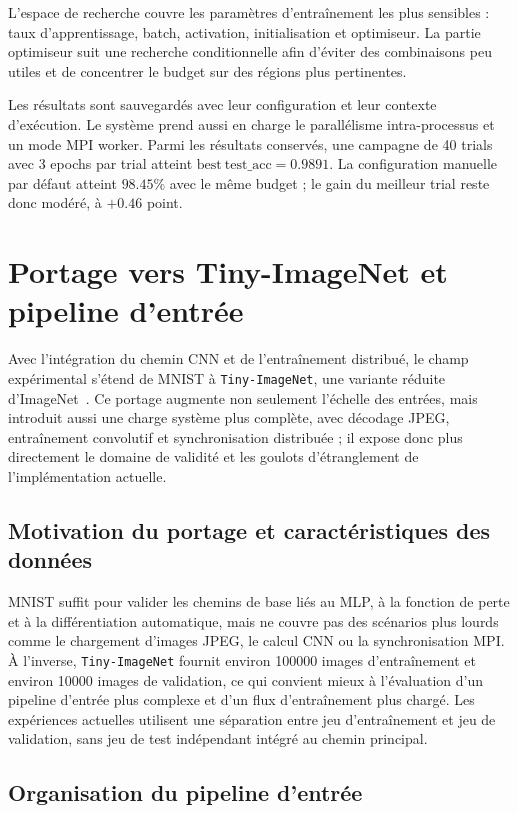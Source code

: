 \documentclass[a4paper,11pt,oneside]{article}
\begin{document}
L'espace de recherche couvre les paramètres d'entraînement les plus sensibles : taux d'apprentissage, batch, activation, initialisation et optimiseur. La partie optimiseur suit une recherche conditionnelle afin d'éviter des combinaisons peu utiles et de concentrer le budget sur des régions plus pertinentes.

Les résultats sont sauvegardés avec leur configuration et leur contexte d'exécution. Le système prend aussi en charge le parallélisme intra-processus et un mode MPI worker. Parmi les résultats conservés, une campagne de 40 trials avec 3 epochs par trial atteint \(\mathrm{best\ test\_acc}=0.9891\). La configuration manuelle par défaut atteint \(98.45\%\) avec le même budget ; le gain du meilleur trial reste donc modéré, à \(+0.46\) point.

\section{Portage vers Tiny-ImageNet et pipeline d'entrée}

Avec l'intégration du chemin CNN et de l'entraînement distribué, le champ expérimental s'étend de MNIST à \texttt{Tiny-ImageNet}, une variante réduite d'ImageNet~\cite{deng2009imagenet}. Ce portage augmente non seulement l'échelle des entrées, mais introduit aussi une charge système plus complète, avec décodage JPEG, entraînement convolutif et synchronisation distribuée ; il expose donc plus directement le domaine de validité et les goulots d'étranglement de l'implémentation actuelle.

\subsection{Motivation du portage et caractéristiques des données}

MNIST suffit pour valider les chemins de base liés au MLP, à la fonction de perte et à la différentiation automatique, mais ne couvre pas des scénarios plus lourds comme le chargement d'images JPEG, le calcul CNN ou la synchronisation MPI. À l'inverse, \texttt{Tiny-ImageNet} fournit environ 100000 images d'entraînement et environ 10000 images de validation, ce qui convient mieux à l'évaluation d'un pipeline d'entrée plus complexe et d'un flux d'entraînement plus chargé. Les expériences actuelles utilisent une séparation entre jeu d'entraînement et jeu de validation, sans jeu de test indépendant intégré au chemin principal.

\subsection{Organisation du pipeline d'entrée}
\end{document}

